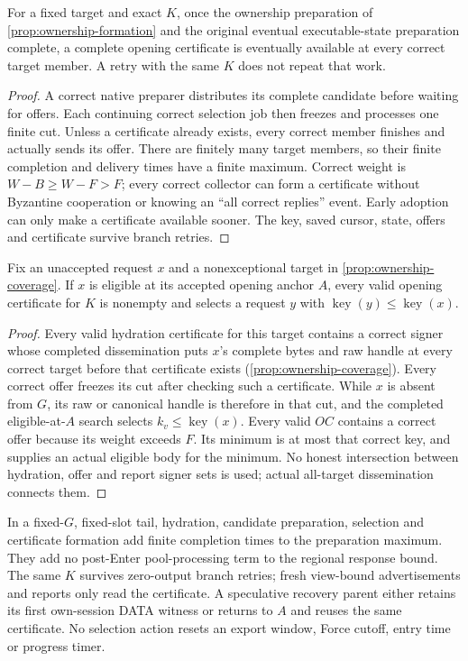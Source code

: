 \begin{proposition}
\label{prop:opening-formation}
For a fixed target and exact $K$, once the ownership preparation of
\cref{prop:ownership-formation} and the original eventual executable-state
preparation complete, a complete opening certificate is eventually
available at every correct target member. A retry with the same $K$
does not repeat that work.
\end{proposition}
\begin{proof}
A correct native preparer distributes its complete candidate before
waiting for offers. Each continuing correct selection job then freezes
and processes one finite cut. Unless a certificate already exists,
every correct member finishes and actually sends its offer. There are
finitely many target members, so their finite completion and delivery
times have a finite maximum. Correct weight is
$W-B\ge W-F>F$; every correct collector can form a certificate without
Byzantine cooperation or knowing an ``all correct replies'' event.
Early adoption can only make a certificate available sooner. The key,
saved cursor, state, offers and certificate survive branch retries.
\end{proof}

\begin{proposition}
\label{prop:opening-coverage}
Fix an unaccepted request $x$ and a nonexceptional target in
\cref{prop:ownership-coverage}. If $x$ is eligible at its accepted opening
anchor $A$, every valid opening certificate for $K$ is nonempty and
selects a request $y$ with
$\operatorname{key}(y)\le\operatorname{key}(x)$.
\end{proposition}
\begin{proof}
Every valid hydration certificate for this target contains a correct
signer whose completed dissemination puts $x$'s complete bytes and
raw handle at every correct target before that certificate exists
(\cref{prop:ownership-coverage}). Every correct offer freezes its cut
after checking such a certificate. While $x$ is absent from $G$, its
raw or canonical handle is therefore in that cut, and the completed
eligible-at-$A$ search selects $k_v\le\operatorname{key}(x)$.
Every valid $\mathit{OC}$ contains a correct offer because its weight
exceeds $F$. Its minimum is at most that correct key, and
 supplies an actual eligible body for the minimum.
No honest intersection between hydration, offer and report signer
sets is used; actual all-target dissemination connects them.
\end{proof}

In a fixed-$G$, fixed-slot tail, hydration, candidate preparation,
selection and certificate formation add finite completion times to
the preparation maximum. They add no post-Enter pool-processing term
to the regional response bound. The same $K$ survives zero-output
branch retries; fresh view-bound advertisements and reports only read
the certificate. A speculative recovery parent either retains its
first own-session DATA witness or returns to $A$ and reuses the same
certificate. No selection action resets an export window, Force cutoff,
entry time or progress timer.
